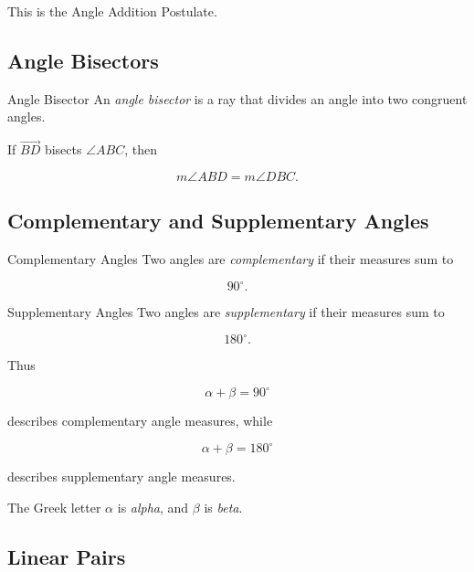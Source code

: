 This is the Angle Addition Postulate.

\subsection{Angle Bisectors}
\label{subsec:angle-bisectors}

\begin{definitionbox}{Angle Bisector}
An \emph{angle bisector} is a ray that divides an angle into two congruent
angles.
\end{definitionbox}

If \(\overrightarrow{BD}\) bisects \(\angle ABC\), then

\[ m\angle ABD=m\angle DBC. \]

\subsection{Complementary and Supplementary Angles}
\label{subsec:complementary-supplementary}

\begin{definitionbox}{Complementary Angles}
Two angles are \emph{complementary} if their measures sum to

\[ 90^\circ. \]
\end{definitionbox}

\begin{definitionbox}{Supplementary Angles}
Two angles are \emph{supplementary} if their measures sum to

\[ 180^\circ. \]
\end{definitionbox}

Thus

\[ \alpha+\beta=90^\circ \]

describes complementary angle measures, while

\[ \alpha+\beta=180^\circ \]

describes supplementary angle measures.

The Greek letter \(\alpha\) is \emph{alpha}, and \(\beta\) is \emph{beta}.

\subsection{Linear Pairs}
\label{subsec:linear-pairs}

